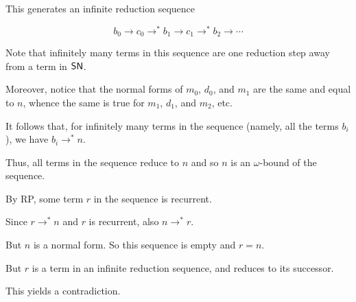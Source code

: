 \documentclass{scrartcl}
\begin{document}
\begin{itemize}
  This generates an infinite reduction sequence

  \[b_0 \to c_0 \to^* b_1 \to c_1 \to^* b_2 \to \cdots \]

  Note that infinitely many terms in this sequence are one reduction step
  away from a term in $\mathsf{SN}$.

  Moreover, notice that the normal forms of $m_0$, $d_0$, and $m_1$ are the same
  and equal to $n$, whence the same is true for $m_1$, $d_1$, and $m_2$, etc.

  It follows that, for infinitely many terms in the sequence
  (namely, all the terms $b_i$), we have $b_i \to^* n$.

  Thus, all terms in the sequence reduce to $n$ and so $n$ is an $\omega$-bound
  of the sequence.

  By RP, some term $r$ in the sequence is recurrent.

  Since $r \to^* n$ and $r$ is recurrent, also $n \to^* r$.

  But $n$ is a normal form.  So this sequence is empty and $r=n$.

  But $r$ is a term in an infinite reduction sequence, and reduces to its successor.

  This yields a contradiction.

\end{itemize}
\end{document}
